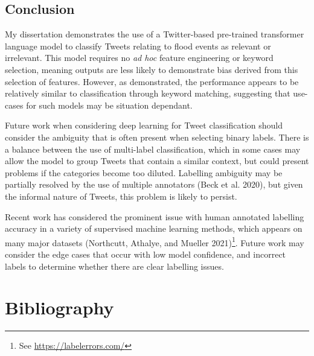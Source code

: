 \documentclass[a4paper, notitlepage]{extreport}
\begin{document}
\hypertarget{conclusion}{%
\section{Conclusion}\label{conclusion}}

My dissertation demonstrates the use of a Twitter-based pre-trained
transformer language model to classify Tweets relating to flood events
as relevant or irrelevant. This model requires no \emph{ad hoc} feature
engineering or keyword selection, meaning outputs are less likely to
demonstrate bias derived from this selection of features. However, as
demonstrated, the performance appears to be relatively similar to
classification through keyword matching, suggesting that use-cases for
such models may be situation dependant.

Future work when considering deep learning for Tweet classification
should consider the ambiguity that is often present when selecting
binary labels. There is a balance between the use of multi-label
classification, which in some cases may allow the model to group Tweets
that contain a similar context, but could present problems if the
categories become too diluted. Labelling ambiguity may be partially
resolved by the use of multiple annotators (Beck et al. 2020), but given
the informal nature of Tweets, this problem is likely to persist.

Recent work has considered the prominent issue with human annotated
labelling accuracy in a variety of supervised machine learning methods,
which appears on many major datasets (Northcutt, Athalye, and Mueller
2021)\footnote{See \url{https://labelerrors.com/}}. Future work may
consider the edge cases that occur with low model confidence, and
incorrect labels to determine whether there are clear labelling issues.

\chapter*{Bibliography}
\end{document}
